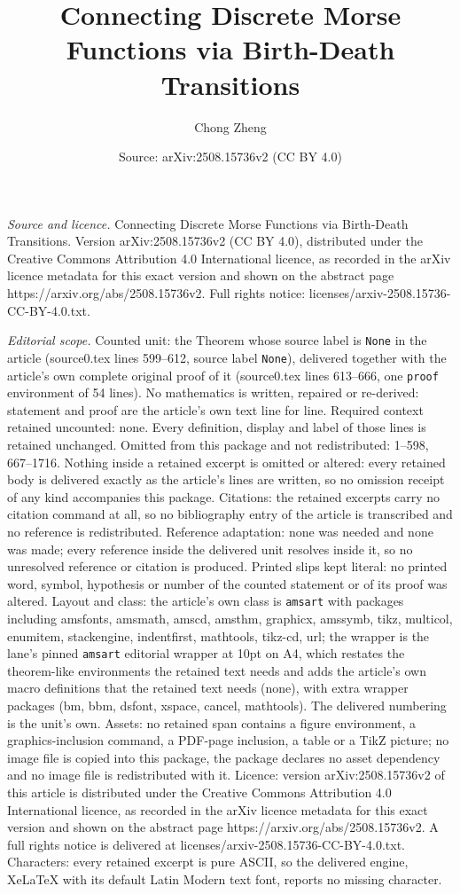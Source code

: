 \documentclass[10pt,a4paper]{amsart}
\title[Connecting Discrete Morse Functions via Birth-Death Transiti]{Connecting Discrete Morse Functions via Birth-Death Transitions}
\author{Chong Zheng}
\date{Source: arXiv:2508.15736v2 (CC BY 4.0)}
\begin{document}
\maketitle

\noindent\emph{Source and licence.} Connecting Discrete Morse Functions via Birth-Death Transitions. Version arXiv:2508.15736v2 (CC BY 4.0), distributed under the Creative Commons Attribution 4.0 International licence, as recorded in the arXiv licence metadata for this exact version and shown on the abstract page https://arxiv.org/abs/2508.15736v2. Full rights notice: licenses/arxiv-2508.15736-CC-BY-4.0.txt.\par\smallskip

\noindent\textit{Editorial scope.} Counted unit: the Theorem whose source label is \texttt{None} in the article (source0.tex lines 599--612, source label \texttt{None}), delivered together with the article's own complete original proof of it (source0.tex lines 613--666, one \texttt{proof} environment of 54 lines). No mathematics is written, repaired or re-derived: statement and proof are the article's own text line for line. Required context retained uncounted: none. Every definition, display and label of those lines is retained unchanged. Omitted from this package and not redistributed: 1--598, 667--1716. Nothing inside a retained excerpt is omitted or altered: every retained body is delivered exactly as the article's lines are written, so no omission receipt of any kind accompanies this package. Citations: the retained excerpts carry no citation command at all, so no bibliography entry of the article is transcribed and no reference is redistributed. Reference adaptation: none was needed and none was made; every reference inside the delivered unit resolves inside it, so no unresolved reference or citation is produced. Printed slips kept literal: no printed word, symbol, hypothesis or number of the counted statement or of its proof was altered. Layout and class: the article's own class is \texttt{amsart} with packages including amsfonts, amsmath, amscd, amsthm, graphicx, amssymb, tikz, multicol, enumitem, stackengine, indentfirst, mathtools, tikz-cd, url; the wrapper is the lane's pinned \texttt{amsart} editorial wrapper at 10pt on A4, which restates the theorem-like environments the retained text needs and adds the article's own macro definitions that the retained text needs (none), with extra wrapper packages (bm, bbm, dsfont, xspace, cancel, mathtools). The delivered numbering is the unit's own. Assets: no retained span contains a figure environment, a graphics-inclusion command, a PDF-page inclusion, a table or a TikZ picture; no image file is copied into this package, the package declares no asset dependency and no image file is redistributed with it. Licence: version arXiv:2508.15736v2 of this article is distributed under the Creative Commons Attribution 4.0 International licence, as recorded in the arXiv licence metadata for this exact version and shown on the abstract page https://arxiv.org/abs/2508.15736v2. A full rights notice is delivered at licenses/arxiv-2508.15736-CC-BY-4.0.txt. Characters: every retained excerpt is pure ASCII, so the delivered engine, XeLaTeX with its default Latin Modern text font, reports no missing character.
\end{document}
